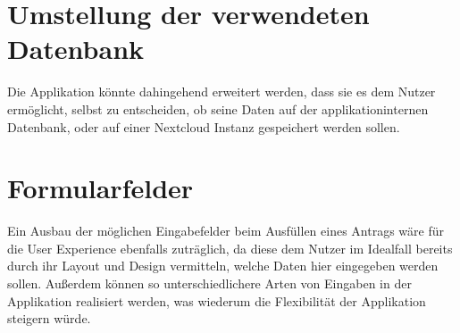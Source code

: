 \section{Umstellung der verwendeten Datenbank}\label{umstellung der verwendeten datenbank}
Die Applikation könnte dahingehend erweitert werden, dass sie es dem Nutzer ermöglicht, 
selbst zu entscheiden, ob seine Daten auf der applikationinternen Datenbank, oder auf einer 
Nextcloud Instanz gespeichert werden sollen. 


\section{Formularfelder}\label{sec: formularfelder}
Ein Ausbau der möglichen Eingabefelder beim Ausfüllen eines Antrags wäre für die
User Experience ebenfalls zuträglich, da diese dem Nutzer im Idealfall bereits durch ihr
Layout und Design vermitteln, welche Daten hier eingegeben werden sollen. Außerdem können
so unterschiedlichere Arten von Eingaben in der Applikation realisiert werden, was wiederum
die Flexibilität der Applikation steigern würde.

